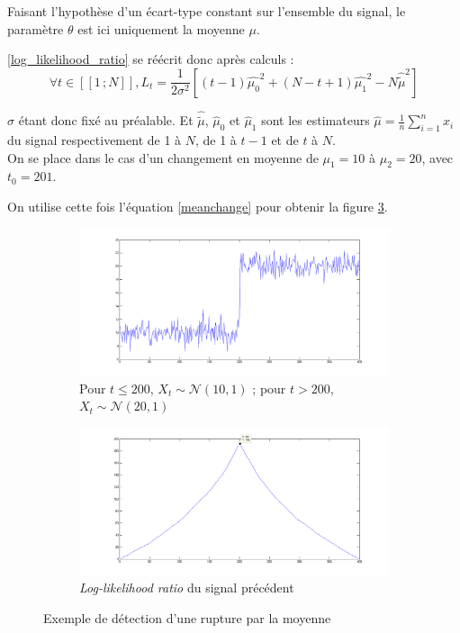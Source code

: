 \documentclass[french,11pt,notitlepage]{report}
\begin{document}
	
	Faisant l'hypothèse d'un écart-type constant sur l'ensemble du signal, le paramètre $\theta$ est ici uniquement la moyenne $\mu$.
	
	\ref{log_likelihood_ratio} se réécrit donc après calculs :
	\begin{equation}
		\forall t \in [\![1\,; N]\!], L_t = \frac{1}{2 \sigma ^2}\left[(t-1)\hat{\mu_0}^2 + (N - t + 1)\hat{\mu_1}^2 - N\hat{\tilde\mu}^2 \right]
		\label{meanchange}
	\end{equation}
	
	$\sigma$ étant donc fixé au préalable. Et $\hat{\tilde\mu}$, $\hat\mu_0$ et $\hat\mu_1$ sont les estimateurs $\hat\mu=\frac1n\sum_{i=1}^nx_i$ du signal respectivement de 1 à $N$, de 1 à $t-1$ et de $t$ à $N$.
	\\
	
	On se place dans le cas d'un changement en moyenne de $\mu_1 = 10$ à $\mu_2 = 20$, avec $t_0 = 201$.
	
	On utilise cette fois l'équation \ref{meanchange} pour obtenir la figure \ref{llr_test_mean}.


	\begin{figure}[h]	
		\begin{subfigure}[t]{.49\textwidth}

  \includegraphics[width=\linewidth]{test_signal_mean.png}
		\caption{Pour $t \leq 200$, $X_t \sim \mathcal{N}(10, 1)$ ; pour $t > 200$, $X_t \sim \mathcal{N}(20, 1)$}
		\label{test_signal_mean}
	\end{subfigure}
	\hfill
	\begin{subfigure}[t]{.49\textwidth}

  \includegraphics[width=\linewidth]{llr_test_mean.png}
		\caption{\textit{Log-likelihood ratio} du signal précédent}
		\label{llr_test_mean}
	\end{subfigure}
	
	\caption{Exemple de détection d'une rupture par la moyenne}
	\end{figure}
	
\end{document}
